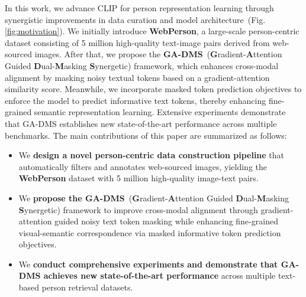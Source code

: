 In this work, we advance CLIP for person representation learning through synergistic improvements in data curation and model architecture~(Fig.\ref{fig:motivation}). We initially introduce \textbf{WebPerson}, a large-scale person-centric dataset consisting of 5 million high-quality text-image pairs derived from web-sourced images. After that, we propose the \textbf{GA-DMS}~(\textbf{G}radient-\textbf{A}ttention Guided \textbf{D}ual-\textbf{M}asking \textbf{S}ynergetic) framework, which enhances cross-modal alignment by masking noisy textual tokens based on a gradient-attention similarity score. Meanwhile, we incorporate masked token prediction objectives to enforce the model to predict informative text tokens, thereby enhancing fine-grained semantic representation learning. Extensive experiments demonstrate that GA-DMS establishes new state-of-the-art performance across multiple benchmarks. The main contributions of this paper are summarized as follows:
\begin{itemize}[noitemsep,topsep=0pt]
\item We \textbf{design a novel person-centric data construction pipeline} that automatically filters and annotates web-sourced images, yielding the \textbf{WebPerson} dataset with 5 million high-quality image-text pairs.

\item We \textbf{propose the GA-DMS}~(\textbf{G}radient-\textbf{A}ttention Guided \textbf{D}ual-\textbf{M}asking \textbf{S}ynergetic) framework to improve cross-modal alignment through gradient-attention guided noisy text token masking while enhancing fine-grained visual-semantic correspondence via masked informative token prediction objectives.

\item We \textbf{conduct comprehensive experiments and demonstrate that GA-DMS achieves new state-of-the-art performance} across multiple text-based person retrieval datasets.
\end{itemize}



